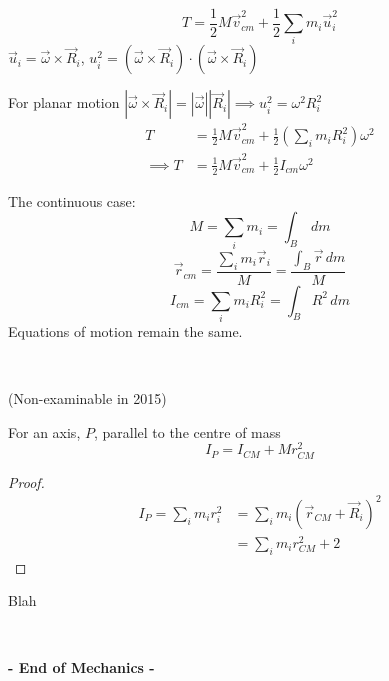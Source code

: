 ~
\[T = \frac{1}{2}M\vec{v}_{cm}^2 + \frac{1}{2}\sum_im_i\vec{u}_i^2\]
$\vec{u}_i = \vec{\omega} \times \vec{R}_i$, $u_i^ 2 = (\vec{\omega}\times\vec{R}_i) \cdot (\vec{\omega}\times\vec{R}_i)$

For planar motion $|\vec{\omega}\times\vec{R}_i| = |\vec{\omega}||\vec{R}_i| \implies u_i^2 = \omega^2R_i^2$
\[\begin{aligned}T &= \frac{1}{2}M\vec{v}_{cm}^2 + \frac{1}{2}\left(\sum_im_i{R}_i^2\right)\omega^2\\
\implies 	T &= \frac{1}{2}M\vec{v}_{cm}^2 + \frac{1}{2}I_{cm}\omega^2
\end{aligned}
\]
\begin{definition}
The continuous case:
\[M = \sum_i m_i = \int_B \,dm\]
\[\vec{r}_{cm} = \frac{\sum_i m_i\vec{r}_i}{M} = \frac{\int_B\vec{r}\,dm}{M}\]
\[I_{cm} = \sum_i m_iR_i^2 =  \int_B R^2\,dm\]
Equations of motion remain the same.
\end{definition}~

\begin{example}
	\vspace*{50pt}
\end{example}




(Non-examinable in 2015)
\begin{theorem}
For an axis, $P$, parallel to the centre of mass	\[I_P = I_{CM} + Mr^2_{CM}\]
\end{theorem}
\begin{proof}
\[\begin{aligned}I_P = \sum_{i} m_ir_i^2 &= \sum_i m_i(\vec{r}_{CM} + \vec{R}_i)^2\\
&= \sum_i m_i r_{CM}^2 + 2	
\end{aligned}
\]
\end{proof}

\begin{example}
	Blah
\end{example}~\\

  \begin{center}
  \textsf{\textbf{- End of Mechanics -}}	
  \end{center}
  
  


